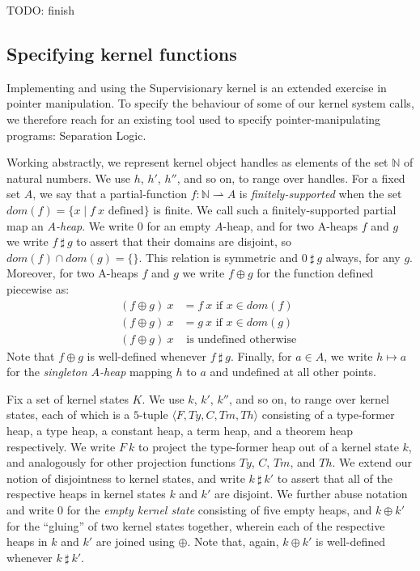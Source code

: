 \documentclass[a4paper, UKenglish, cleveref, autoref, thm-restate, colorlinks]{lipics-v2021}
\newcommand{\todo}[1]{}
\renewcommand{\todo}[1]{{\color{red} TODO: {#1}}}
\begin{document}
\todo{finish}

\subsection{Specifying kernel functions}
\label{subsect.specifying.kernel.functions}

Implementing and using the Supervisionary kernel is an extended exercise in pointer manipulation.
To specify the behaviour of some of our kernel system calls, we therefore reach for an existing tool used to specify pointer-manipulating programs: Separation Logic.

Working abstractly, we represent kernel object handles as elements of the set $\mathbb{N}$ of natural numbers.
We use $h$, $h'$, $h''$, and so on, to range over handles.
For a fixed set $A$, we say that a partial-function $f : \mathbb{N} \rightharpoonup A$ is \emph{finitely-supported} when the set $dom(f) = \{ x \mid f\ x \text{ defined} \}$ is finite.
We call such a finitely-supported partial map an \emph{$A$-heap}.
We write $0$ for an empty $A$-heap, and for two A-heaps $f$ and $g$ we write $f\ \sharp\ g$ to assert that their domains are disjoint, so $dom(f) \cap dom(g) = \{ \}$.
This relation is symmetric and $0\ \sharp\ g$ always, for any $g$.
Moreover, for two A-heaps $f$ and $g$ we write $f \oplus g$ for the function defined piecewise as:
\begin{align*}
(f \oplus g)\ x & = f\ x \text{ if $x \in dom(f)$ } \\
(f \oplus g)\ x & = g\ x \text{ if $x \in dom(g)$ } \\
(f \oplus g)\ x & \text{ is undefined otherwise }
\end{align*}
Note that $f \oplus g$ is well-defined whenever $f\ \sharp\ g$.
Finally, for $a \in A$, we write $h \mapsto a$ for the \emph{singleton $A$-heap} mapping $h$ to $a$ and undefined at all other points.

Fix a set of kernel states $K$.
We use $k$, $k'$, $k''$, and so on, to range over kernel states, each of which is a $5$-tuple $\langle F, Ty, C, Tm, Th \rangle$ consisting of a type-former heap, a type heap, a constant heap, a term heap, and a theorem heap respectively.
We write $F\ k$ to project the type-former heap out of a kernel state $k$, and analogously for other projection functions $Ty$, $C$, $Tm$, and $Th$.
We extend our notion of disjointness to kernel states, and write $k\ \sharp\ k'$ to assert that all of the respective heaps in kernel states $k$ and $k'$ are disjoint.
We further abuse notation and write $0$ for the \emph{empty kernel state} consisting of five empty heaps, and $k \oplus k'$ for the ``gluing'' of two kernel states together, wherein each of the respective heaps in $k$ and $k'$ are joined using $\oplus$.
Note that, again, $k \oplus k'$ is well-defined whenever $k\ \sharp\ k'$.
\end{document}

